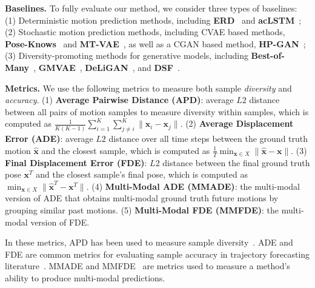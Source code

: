 \documentclass[runningheads]{llncs}
\begin{document}
	\vspace{1mm}
	\noindent\textbf{Baselines.}
	To fully evaluate our method, we consider three types of baselines: (1) Deterministic motion prediction methods, including \textbf{ERD}~\cite{fragkiadaki2015recurrent} and \textbf{acLSTM}~\cite{li2017auto}; (2) Stochastic motion prediction methods, including CVAE based methods, \textbf{Pose-Knows}~\cite{walker2017pose} and \textbf{MT-VAE}~\cite{yan2018mt}, as well as a CGAN based method, \textbf{HP-GAN}~\cite{barsoum2018hp}; (3) Diversity-promoting methods for generative models, including \textbf{Best-of-Many}~\cite{bhattacharyya2018accurate}, \textbf{GMVAE}~\cite{dilokthanakul2016deep}, \textbf{DeLiGAN}~\cite{gurumurthy2017deligan}, and \textbf{DSF}~\cite{yuan2019diverse}.
	
	\vspace{2mm}
	\noindent\textbf{Metrics.} We use the following metrics to measure both sample \emph{diversity} and \emph{accuracy}. (1) \textbf{Average Pairwise Distance (APD)}: average $L2$ distance between all pairs of motion samples to measure diversity within samples, which is computed as $\frac{1}{K(K-1)}\sum_{i=1}^K \sum_{j\neq i}^K \|\mathbf{x}_i - \mathbf{x}_j\|$. (2) \textbf{Average Displacement Error (ADE)}: average $L2$ distance over all time steps between the ground truth motion $\hat{\mathbf{x}}$ and the closest sample, which is computed as $\frac{1}{T}\min_{\mathbf{x} \in X} \|\hat{\mathbf{x}} - \mathbf{x}\|$. (3) \textbf{Final Displacement Error (FDE)}: $L2$ distance between the final ground truth pose $\mathbf{x}^T$ and the closest sample's final pose, which is computed as $\min_{\mathbf{x} \in X} \|\hat{\mathbf{x}}^T - \mathbf{x}^T\|$. (4) \textbf{Multi-Modal ADE (MMADE)}: the multi-modal version of ADE that obtains multi-modal ground truth future motions by grouping similar past motions. (5) \textbf{Multi-Modal FDE (MMFDE)}: the multi-modal version of FDE.
	
	In these metrics, APD has been used to measure sample diversity~\cite{aliakbarian2020stochastic}. ADE and FDE are common metrics for evaluating sample accuracy in trajectory forecasting literature~\cite{alahi2016social,lee2017desire,gupta2018social}. MMADE and MMFDE~\cite{yuan2019diverse} are metrics used to measure a method's ability to produce multi-modal predictions.
	
\end{document}
